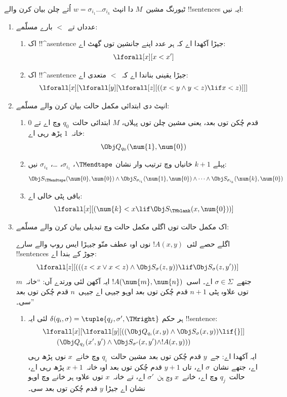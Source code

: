 \documentclass[../../../include/open-logic-section]{subfiles}
\begin{document}
ٹیورنگ مشین~$M$ دا انپٹ $w = \sigma_{i_1}\dots\sigma_{i_k}$
اُتے چلن بیان کرن والے !!{sentence}s ایہ نیں:
\begin{enumerate}
\item عدداں تے~$<$ بارے مسلّمے:
\begin{enumerate}
\item اک !!^a{sentence} جیڑا آکھدا اے کہ ہر عدد اپنے جانشین توں
  گھٹ اے:
\[
\lforall[x][x < x']
\]
\item اک !!^a{sentence} جیڑا یقینی بناندا اے کہ~$<$ متعدی اے:
\[
\lforall[x][\lforall[y][\lforall[z][
      ((x < y \land y < z) \lif x < z)]]]
\]
\end{enumerate}
\item انپٹ دی ابتدائی مکمل حالت بیان کرن والے مسلّمے:
\begin{enumerate}
\item $0$ قدم چُکن توں بعد، یعنی مشین چلن توں پہلاں،
  $M$ ابتدائی حالت~$q_0$ وچ اے تے خانہ~$1$ پڑھ رہی اے:
\[
\Obj Q_{q_0}(\num{1}, \num{0})
\]
\item پہلے $k+1$ خانیاں وچ ترتیب وار نشان $\TMendtape$،
  $\sigma_{i_1}$، \dots، $\sigma_{i_k}$ نیں:
\[
\Obj S_\TMendtape(\num{0}, \num{0}) \land
\Obj S_{\sigma_{i_1}}(\num{1}, \num{0}) \land
\dots \land
\Obj S_{\sigma_{i_k}}(\num{k}, \num{0})
\]
\item باقی پٹی خالی اے:
\[
\lforall[x][(\num{k} < x \lif \Obj S_\TMblank(x, \num{0}))]
\]
\end{enumerate}
\item اک مکمل حالت توں اگلی مکمل حالت وچ تبدیلی بیان کرن
  والے مسلّمے:

اگلے حصے لئی~$!A(x, y)$ نوں اوہ عطف منّو جیہڑا ایس روپ
والے سارے !!{sentence}s جوڑ کے بندا اے:
\[
\lforall[z][
  (((z < x \lor x < z) \land \Obj S_\sigma(z, y))
  \lif \Obj S_\sigma(z, y'))]
\]
جتھے~$\sigma \in \Sigma$ اے۔ اسی~$!A(\num{m},\num{n})$
ایہ آکھن لئی ورتدے آں: “خانہ~$m$ توں علاوہ پٹی
$n+1$ قدم چُکن توں بعد اوہو جیہی اے جیہی~$n$ قدم
چُکن توں بعد سی۔”
\begin{enumerate}
\item {} ہر حکم $\delta(q_i, \sigma) =
  \tuple{q_j, \sigma', \TMright}$ لئی ایہ !!{sentence}:
\begin{align*}
& \lforall[x][\lforall[y][(
   (\Obj Q_{q_i}(x, y) \land \Obj S_{\sigma}(x, y)) \lif {}]] \\
&\qquad   (\Obj Q_{q_j}(x', y') \land \Obj S_{\sigma'}(x, y') \land
!A(x, y)))
\end{align*}
ایہ آکھدا اے: جے~$y$ قدم چُکن توں بعد مشین حالت~$q_i$
وچ خانے~$x$ نوں پڑھ رہی اے، جتھے نشان~$\sigma$ اے، تاں
$y+1$ قدم چُکن توں بعد اوہ خانہ~$x+1$ پڑھ رہی اے،
حالت~$q_j$ وچ اے، خانے~$x$ وچ ہن~$\sigma'$ اے، تے
خانہ~$x$ توں علاوہ ہر خانے وچ اوہو نشان اے جیڑا
$y$ قدم چُکن توں بعد سی۔


\end{enumerate}
\end{enumerate}
\end{document}
